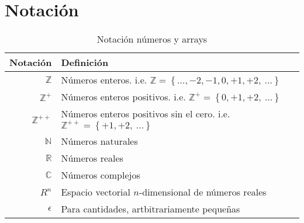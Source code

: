 \chapter*{Notación}



\begin{table}[H]
    \begin{center}
        \begin{tabularx}{\textwidth}{|r|X|}
            \hline
            \textbf{Notación}   & \textbf{Definición}                                                                                               \\
            \hline
            $ \mathbb{Z} $      & Números enteros. i.e. \scriptsize{${ \mathbb{Z}  = \left\{ \ldots, -2, -1, 0, +1, +2,~\ldots \right\} }$}         \\
            $ \mathbb{Z}^{+} $  & Números enteros positivos. i.e. \scriptsize{${ \mathbb{Z}^{+}  = \left\{ 0, +1, +2,~\ldots \right\} }$}           \\
            $ \mathbb{Z}^{++} $ & Números enteros positivos sin el cero. i.e. \scriptsize{${ \mathbb{Z}^{++}  = \left\{ +1, +2,~\ldots \right\} }$} \\
            $ \mathbb{N} $      & Números naturales                                                                                                 \\
            $ \mathbb{R} $      & Números reales                                                                                                    \\
            $ \mathbb{C} $      & Números complejos                                                                                                 \\
            $ R^{n} $           & Espacio vectorial $n$-dimensional de números reales                                                               \\
            $ \epsilon $        & Para cantidades, artbitrariamente pequeñas                                                                        \\
            \hline
        \end{tabularx}
        \caption{Notación números y arrays}
        \label{tab:nnotation-part-2}
    \end{center}
\end{table}


